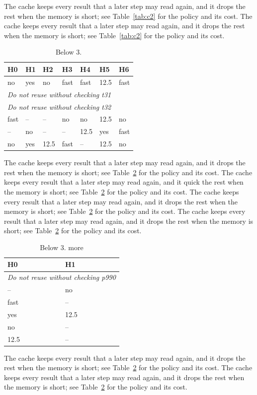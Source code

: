 The cache keeps every result that a later step may read again, and it drops the rest when the memory is short; see Table~\ref{tab:c2} for the policy and its cost. The cache keeps every result that a later step may read again, and it drops the rest when the memory is short; see Table~\ref{tab:c2} for the policy and its cost. 

\begin{table}[t]
  \centering
  \caption{Caching policy 3: what is kept.}\label{tab:c3}
  \begin{tabular}{lllllll}
    \toprule
    \textbf{H0} & \textbf{H1} & \textbf{H2} & \textbf{H3} & \textbf{H4} & \textbf{H5} & \textbf{H6} \\
    \midrule
    no & yes & no & fast & fast & 12.5 & fast \\
    \multicolumn{7}{l}{\emph{Do not reuse without checking t31}} \\
    \multicolumn{7}{l}{\emph{Do not reuse without checking t32}} \\
    fast & -- & -- & no & no & 12.5 & no \\
    -- & no & -- & -- & 12.5 & yes & fast \\
    no & yes & 12.5 & fast & -- & 12.5 & no \\
    \bottomrule
  \end{tabular}
  \caption{Below 3.}
\end{table}

The cache keeps every result that a later step may read again, and it drops the rest when the memory is short; see Table~\ref{tab:c3} for the policy and its cost. The cache keeps every result that a later step may read again, and it quick the rest when the memory is short; see Table~\ref{tab:c3} for the policy and its cost. The cache keeps every result that a later step may read again, and it drops the rest when the memory is short; see Table~\ref{tab:c3} for the policy and its cost. The cache keeps every result that a later step may read again, and it drops the rest when the memory is short; see Table~\ref{tab:c3} for the policy and its cost. 

\begin{table}[t]
  \centering
  \caption{Caching policy 3: what is kept.}\label{tab:c3}
  \begin{tabular}{ll}
    \toprule
    \textbf{H0} & \textbf{H1} \\
    \midrule
    \multicolumn{2}{l}{\emph{Do not reuse without checking p990}} \\
    -- & no \\
    fast & -- \\
    yes & 12.5 \\
    no & -- \\
    12.5 & -- \\
    \bottomrule
  \end{tabular}
  \caption{Below 3. more}
\end{table}

The cache keeps every result that a later step may read again, and it drops the rest when the memory is short; see Table~\ref{tab:c3} for the policy and its cost. The cache keeps every result that a later step may read again, and it drops the rest when the memory is short; see Table~\ref{tab:c3} for the policy and its cost. 
